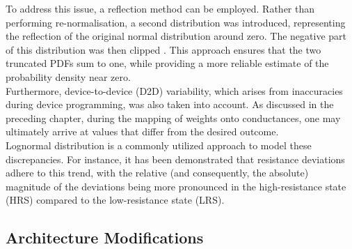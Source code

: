 \noindent To address this issue, a reflection method can be employed. Rather than performing re-normalisation, a second distribution was introduced, representing the reflection of the original normal distribution around zero. The negative part of this distribution was then clipped \cite{jones1993simple}. This approach ensures that the two truncated PDFs sum to one, while providing a more reliable estimate of the probability density near zero.\\

\noindent Furthermore, device-to-device (D2D) variability, which arises from inaccuracies during device programming, was also taken into account. As discussed in the preceding chapter, during the mapping of weights onto conductances, one may ultimately arrive at values that differ from the desired outcome. \\

\noindent Lognormal distribution is a commonly utilized approach to model these discrepancies. For instance, it has been demonstrated that resistance deviations adhere to this trend, with the relative (and consequently, the absolute) magnitude of the deviations being more pronounced in the high-resistance state (HRS) compared to the low-resistance state (LRS).

\subsection{Architecture Modifications}



